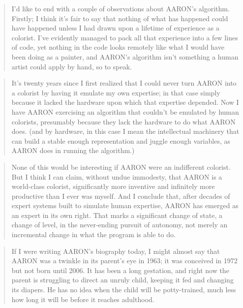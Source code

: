 \begin{quotation}
  I'd like to end with a couple of observations about AARON's algorithm. Firstly; I think it's fair to say that nothing of what has happened could have happened unless I had drawn upon a lifetime of experience as a colorist.  I've evidently managed to pack all that experience into a few lines of code,  yet nothing in the code looks remotely like what I would have been doing as a painter, and AARON's algorithm isn't something a human artist could apply by hand, so to speak.
\end{quotation}

\begin{quotation}
  It's twenty years since I first realized that I could never turn AARON into a colorist by having it emulate my own expertise; in that case simply because it lacked the hardware upon which that expertise depended. Now I have AARON exercising an algorithm that couldn't be emulated by human colorists, presumably because they lack the hardware to do what AARON does. (and by hardware, in this case I mean the intellectual machinery that can build a stable enough representation and juggle enough variables, as AARON does in running the algorithm.) 
\end{quotation}

\begin{quotation}
  None of this would be interesting if AARON were an indifferent colorist. But I think I can claim, without undue immodesty, that AARON is a world-class colorist, significantly more inventive and infinitely more productive than I ever was myself. And I conclude that, after decades of expert systems  built to simulate human expertise, AARON has emerged as an expert in its own right. That marks a significant change of state, a change of level, in the never-ending pursuit of autonomy, not merely an incremental change in what the program is able to do. 
\end{quotation}

\begin{quotation}
  If I were writing AARON's biography today, I might almost say that AARON was a twinkle in its parent's eye in 1963; it was conceived in 1972 but not born until 2006. It has been a long gestation, and right now the parent is struggling to direct an unruly child, keeping it fed and changing its diapers. He has no idea when the child will be potty-trained, much less how long it will be before it reaches adulthood.
\end{quotation}




